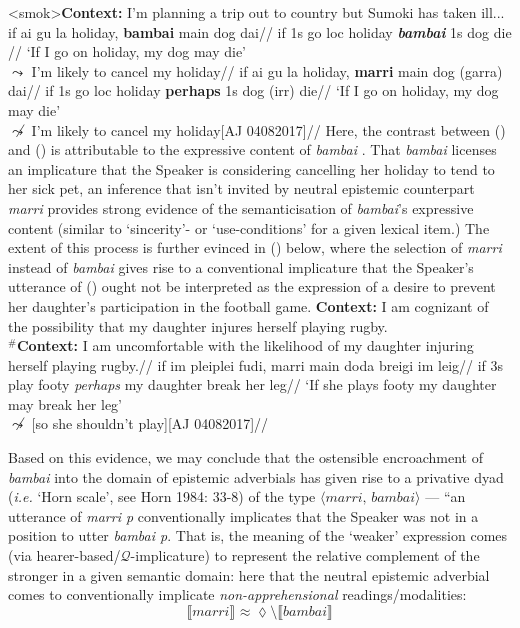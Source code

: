 \documentclass[11pt]{article}
\providecommand{\denote}[2][]{\ensuremath{\llbracket{#2}\rrbracket^{#1}}}
\begin{document}
\pex<smok>\textbf{Context:} I'm planning a trip out to country but Sumoki has taken ill...
\a{}\begingl\gla if ai gu la holiday, \textbf{bambai} main dog dai//
\glb if 1s go {\sc loc} holiday \textit{\textbf{bambai}} 1s dog die //
\glft `If I go on holiday, my dog may die'\\$\leadsto$ I'm likely to cancel my holiday//
\endgl
\a{}\begingl
\gla if ai gu la holiday, \textbf{marri} main dog (garra) dai//
\glb if 1s go {\sc loc} holiday \textbf{perhaps} 1s dog {\sc(irr)} die//
\glft `If I go on holiday, my dog may die'\\$\not\leadsto$ I'm likely to cancel my holiday\hfill[AJ 04082017]//
\endgl
\xe
Here, the contrast between () and () is attributable to the expressive content of \textit{bambai} \citep[cf.][]{Kaplan1999}. That \textit{bambai} licenses an implicature that the Speaker is considering cancelling her holiday to tend to her sick pet, an inference that isn't invited by neutral epistemic counterpart \textit{marri} provides strong evidence of the semanticisation of \textit{bambai}'s expressive content (similar to `sincerity'- or `use-conditions' for a given lexical item.) The extent of this process is further evinced in (\nextx) below, where the selection of \textit{marri} instead of \textit{bambai} gives rise to a conventional implicature that the Speaker's utterance of (\nextx) ought not be interpreted as the expression of a desire to prevent her daughter's participation in the football game.
\pex\begingl
\glpreamble\textbf{Context:} I am cognizant of the possibility that my daughter injures herself playing rugby.\\\textbf{$^\#$Context:} I am uncomfortable with the likelihood of my daughter injuring herself playing rugby.//
\gla if im pleiplei fudi, marri main doda breigi im leig//
\glb  if 3s play footy \textsl{perhaps} my daughter break her leg//
\glft `If she plays footy my daughter may break her leg'\\\hspace*{\fill}$\not\leadsto$ [so she shouldn't play]\hfill[AJ 04082017]//
\endgl\xe

Based on this evidence, we may conclude that the ostensible encroachment of \textit{bambai} into the domain of epistemic adverbials has given rise to a privative dyad (\textit{i.e.} `Horn scale', see Horn 1984: 33-8) of the type $\langle\textit{marri, bambai}\rangle$ --- ``an utterance of \textit{marri p} conventionally implicates that the Speaker was not in a position to utter \textit{bambai p}. That is, the meaning of the `weaker' expression comes (via hearer-based/$ \mathcal Q$-implicature) to represent the relative complement of the stronger in a given semantic domain: here that the neutral epistemic adverbial comes to conventionally implicate \textit{non-apprehensional} readings/modalities: $$\denote{\textit{marri}}\approx\lozenge\setminus\denote{\textit{bambai}}$$
\end{document}
